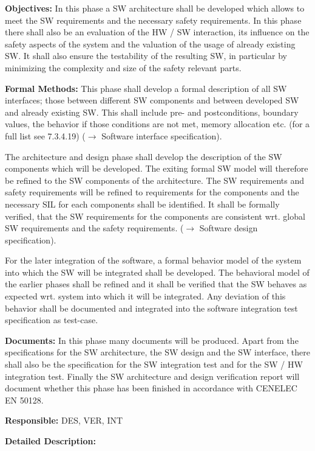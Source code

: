 {\bf Objectives:} In this phase a SW architecture shall be developed which
allows to meet the SW requirements and the necessary safety requirements. In
this phase there shall also be an evaluation of the HW / SW interaction, its
influence on the safety aspects of the system and the valuation of the usage of
already existing SW. It shall also ensure the testability of the resulting SW,
in particular by minimizing the complexity and size of the safety relevant
parts.

{\bf Formal Methods:} This phase shall develop a formal description of all SW
interfaces; those between different SW components and between developed SW and
already existing SW. This shall include pre- and postconditions, boundary
values, the behavior if those conditions are not met, memory allocation
etc. (for a full list see 7.3.4.19) ($\rightarrow$ Software interface
specification).

The architecture and design phase shall develop the description of the SW
components which will be developed. The exiting formal SW model will therefore
be refined to the SW components of the architecture. The SW requirements and
safety requirements will be refined to requirements for the components and the
necessary SIL for each components shall be identified. It shall be formally
verified, that the SW requirements for the components are consistent wrt. global
SW requirements and the safety requirements. ($\rightarrow$ Software design
specification).

For the later integration of the software, a formal behavior model of the system
into which the SW will be integrated shall be developed. The behavioral model of
the earlier phases shall be refined and it shall be verified that the SW behaves
as expected wrt. system into which it will be integrated. Any deviation of this
behavior shall be documented and integrated into the software integration
test specification as test-case.

{\bf Documents:} In this phase many documents will be produced. Apart from the
specifications for the SW architecture, the SW design and the SW interface,
there shall also be the specification for the SW integration test and for the SW
/ HW integration test. Finally the SW architecture and design verification
report will document whether this phase has been finished in accordance with
CENELEC EN 50128.

{\bf Responsible:} DES, VER, INT

{\Huge \bf Detailed Description:}




